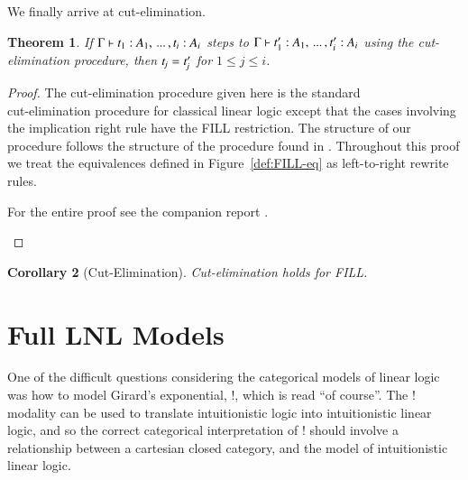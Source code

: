 \documentclass[preprint,12pt]{elsarticle}
\newtheorem{theorem}{Theorem}
\newtheorem{corollary}[theorem]{Corollary}
\begin{document}
We finally arrive at cut-elimination.
\begin{theorem}
  \label{thm:cut-pro}
  If $ \Gamma  \vdash  \mathit{t_{{\mathrm{1}}}}  :  \mathit{A_{{\mathrm{1}}}}  , \, ... \, ,  \mathit{t_{\mathit{i}}}  :  \mathit{A_{\mathit{i}}} $ steps to $ \Gamma  \vdash  \mathit{t'_{{\mathrm{1}}}}  :  \mathit{A_{{\mathrm{1}}}}  , \, ... \, ,  \mathit{t'_{\mathit{i}}}  :  \mathit{A_{\mathit{i}}} $ using the cut-elimination procedure, then $\mathit{t_{\mathit{j}}}  =  \mathit{t'_{\mathit{j}}}$
  for $1 \leq j \leq i$.
\end{theorem}
\begin{proof}
  The cut-elimination procedure given here is the standard\\
  cut-elimination
  procedure for classical linear logic except that the
  cases involving the implication right rule have the FILL
  restriction. The structure of our procedure follows the structure of
  the procedure found in \cite{Mellies:2009}. Throughout this proof we
  treat the equivalences defined in Figure~\ref{def:FILL-eq} as
  left-to-right rewrite rules. \begin{paper} For the entire proof see
    the companion report \cite{Eades:2015}.\end{paper}
  
\end{proof}

\begin{corollary}[Cut-Elimination]
  \label{corollary:cut-elimination}
  Cut-elimination holds for FILL.
\end{corollary}

\section{Full LNL Models}
\label{sec:full_lnl_models}
One of the difficult questions considering the categorical models of
linear logic was how to model Girard's exponential, $!$, which is read
``of course''.  The $!$ modality can be used to translate
intuitionistic logic into intuitionistic linear logic, and so the
correct categorical interpretation of $!$ should involve a
relationship between a cartesian closed category, and the model of
intuitionistic linear logic.
\end{document}
